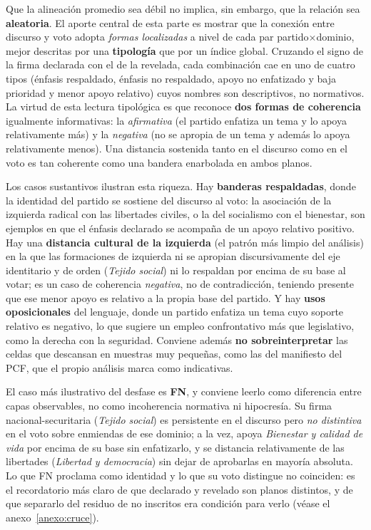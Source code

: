 Que la alineación promedio sea débil no implica, sin embargo, que la relación sea
\textbf{aleatoria}. El aporte central de esta parte es mostrar que la conexión
entre discurso y voto adopta \emph{formas localizadas} a nivel de cada par
partido$\times$dominio, mejor descritas por una \textbf{tipología} que por un
índice global. Cruzando el signo de la firma declarada con el de la revelada,
cada combinación cae en uno de cuatro tipos (énfasis respaldado, énfasis no
respaldado, apoyo no enfatizado y baja prioridad y menor apoyo relativo) cuyos
nombres son descriptivos, no normativos. La virtud de esta lectura tipológica es
que reconoce \textbf{dos formas de coherencia} igualmente informativas: la
\emph{afirmativa} (el partido enfatiza un tema y lo apoya relativamente más) y la
\emph{negativa} (no se apropia de un tema y además lo apoya relativamente menos).
Una distancia sostenida tanto en el discurso como en el voto es tan coherente como
una bandera enarbolada en ambos planos.

Los casos sustantivos ilustran esta riqueza. Hay \textbf{banderas respaldadas},
donde la identidad del partido se sostiene del discurso al voto: la asociación de
la izquierda radical con las libertades civiles, o la del socialismo con el
bienestar, son ejemplos en que el énfasis declarado se acompaña de un apoyo
relativo positivo. Hay una \textbf{distancia cultural de la izquierda} (el
patrón más limpio del análisis) en la que las formaciones de izquierda ni se
apropian discursivamente del eje identitario y de orden (\emph{Tejido
social}) ni lo respaldan por encima de su base al votar; es un caso de coherencia
\emph{negativa}, no de contradicción, teniendo presente que ese menor apoyo es
relativo a la propia base del partido. Y hay \textbf{usos
oposicionales} del lenguaje, donde un partido enfatiza un tema cuyo soporte
relativo es negativo, lo que sugiere un empleo confrontativo más que legislativo,
como la derecha con la seguridad. Conviene además \textbf{no sobreinterpretar} las
celdas que descansan en muestras muy pequeñas, como las del manifiesto del PCF,
que el propio análisis marca como indicativas.

El caso más ilustrativo del desfase es \textbf{FN}, y conviene leerlo como
diferencia entre capas observables, no como incoherencia normativa ni
hipocresía. Su firma nacional-securitaria (\emph{Tejido social}) es
persistente en el discurso pero \emph{no distintiva} en el voto sobre enmiendas de
ese dominio; a la vez, apoya \emph{Bienestar y calidad de vida} por encima de su base sin
enfatizarlo, y se distancia relativamente de las libertades
(\emph{Libertad y democracia}) sin dejar de aprobarlas en mayoría absoluta. Lo que
FN proclama como identidad y lo que su voto distingue no coinciden: es el
recordatorio más claro de que declarado y revelado son planos distintos, y de que
separarlo del residuo de no inscritos era condición para verlo
(véase el anexo~\ref{anexo:cruce}).

